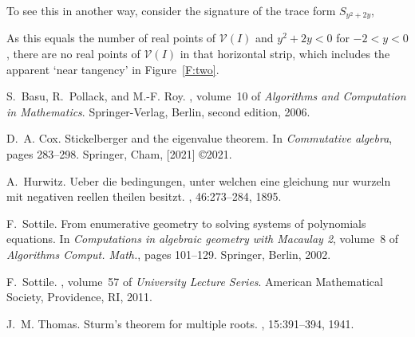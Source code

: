 \documentclass[12pt]{amsart}
\theoremstyle{definition}
\newcommand{\calV}{\mathcal{V}}
\begin{document}
To see this in another way, consider the signature of the trace form $S_{y^2+2y}$,
%
\begin{leftbar}

\end{leftbar}
%
\noindent As this equals the number of real points of $\calV(I)$ and $y^2+2y<0$ for $-2<y<0$, there are no real points of
$\calV(I)$ in that horizontal strip, which includes the apparent `near tangency' in Figure~\ref{F:two}.


\begin{thebibliography}{1}

S.~Basu, R.~Pollack, and M.-F. Roy.
, volume~10 of {\em
  Algorithms and Computation in Mathematics}.
\newblock Springer-Verlag, Berlin, second edition, 2006.

D.~A. Cox.
\newblock Stickelberger and the eigenvalue theorem.
\newblock In {\em Commutative algebra}, pages 283--298. Springer, Cham, [2021]
  \copyright 2021.

A.~Hurwitz.
\newblock Ueber die bedingungen, unter welchen eine gleichung nur wurzeln mit
  negativen reellen theilen besitzt.
, 46:273--284, 1895.

F.~Sottile.
\newblock From enumerative geometry to solving systems of polynomials
  equations.
\newblock In {\em Computations in algebraic geometry with {M}acaulay 2},
  volume~8 of {\em Algorithms Comput. Math.}, pages 101--129. Springer, Berlin,
  2002.

F.~Sottile.
, volume~57 of {\em
  University Lecture Series}.
\newblock American Mathematical Society, Providence, RI, 2011.

J.~M. Thomas.
\newblock Sturm's theorem for multiple roots.
, 15:391--394, 1941.

\end{thebibliography}
\end{document}
